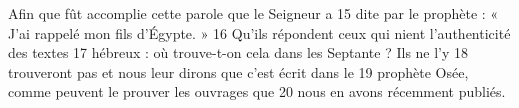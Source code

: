 Afin que fût accomplie cette parole que le Seigneur a	 
15	 	dite par le prophète : « J'ai rappelé mon fils d'Égypte. »	 
16	 	Qu'ils répondent ceux qui nient l'authenticité des textes	 
17	 	hébreux : où trouve-t-on cela dans les Septante ? Ils ne l'y	 
18	 	trouveront pas et nous leur dirons que c'est écrit dans le	 
19	 	prophète Osée, comme peuvent le prouver les ouvrages que	 
20	 	nous en avons récemment publiés.